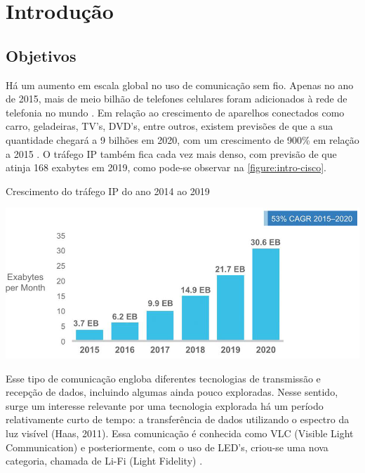 	\chapter*[Introdução]{Introdução} %
	
	\section*{Objetivos}\label{sec-objetivos}
	
	Há um aumento em escala global no uso de comunicação sem fio\cite{load-balancing}. Apenas no ano de 2015, mais de meio bilhão de telefones celulares foram adicionados à rede de telefonia no mundo \cite{cisco-forecast}. Em relação ao crescimento de aparelhos conectados como carro, geladeiras, TV’s, DVD’s, entre outros, existem previsões de que a sua quantidade chegará a 9 bilhões em 2020, com um crescimento de 900\% em relação a 2015 \cite{erricson-report}. O tráfego IP também fica cada vez mais denso, com previsão de que atinja 168 exabytes em 2019, como pode-se observar na \autoref{figure:intro-cisco}.

	\begin{chart}[ht!]
		\caption{\label{figure:intro-cisco}Crescimento do tráfego IP do ano 2014 ao 2019}
		\begin{center}
			\includegraphics[scale=0.5]{cisco_exabytes_per_month.png}
		\end{center}
	\end{chart}
	
	 Esse tipo de comunicação engloba diferentes tecnologias de transmissão e recepção de dados, incluindo algumas ainda pouco exploradas. Nesse sentido, surge um interesse relevante por uma tecnologia explorada há um período relativamente curto de tempo: a transferência de dados utilizando o espectro da luz visível (Haas, 2011). Essa comunicação é conhecida como VLC (Visible Light Communication) e posteriormente, com o uso de LED's, criou-se uma nova categoria, chamada de Li-Fi (Light Fidelity) \cite{what-is-lifi}. \par

